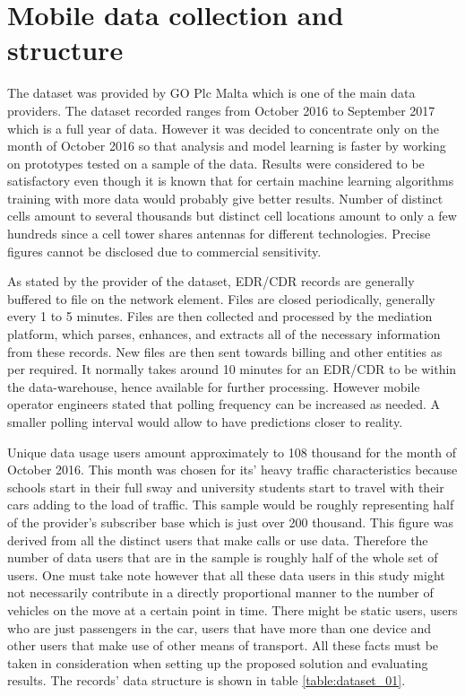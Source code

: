 \documentclass[12pt, a4paper]{report}
\theoremstyle{definition}
\theoremstyle{definition}%
\theoremstyle{definition}%
\theoremstyle{definition}%
\theoremstyle{definition}%
\theoremstyle{definition}%
\begin{document}
\section{Mobile data collection and structure} \label{section:methodology:mobile_data_collection_structure}

The dataset was provided by GO Plc Malta which is one of the main data providers. The dataset recorded ranges from October 2016 to September 2017 which is a full year of data. However it was decided to concentrate only on the month of October 2016 so that analysis and model learning is faster by working on prototypes tested on a sample of the data. Results were considered to be satisfactory even though it is known that for certain machine learning  algorithms training with more data would probably give better results. Number of distinct cells amount to several thousands but distinct cell locations amount to only a few hundreds since a cell tower shares antennas for different technologies. Precise figures cannot be disclosed due to commercial sensitivity.

As stated by the provider of the dataset, EDR/CDR records are generally buffered to file on the network element. Files are closed periodically, generally every 1 to 5 minutes. Files are then collected and processed by the mediation platform, which parses, enhances, and extracts all of the necessary information from these records. New files are then sent towards billing and other entities as per required. It normally takes around 10 minutes for an EDR/CDR to be within the data-warehouse, hence available for further processing. However mobile operator engineers stated that polling frequency can be increased as needed. A smaller polling interval would allow to have predictions closer to reality.

Unique data usage users amount approximately to 108 thousand for the month of October 2016. This month was chosen for its' heavy traffic characteristics because schools start in their full sway and university students start to travel with their cars adding to the load of traffic. This sample would be roughly representing half of the provider's subscriber base which is just over 200 thousand. This figure was derived from all the distinct users that make calls or use data. Therefore the number of data users that are in the sample is roughly half of the whole set of users. One must take note however that all these data users in this study might not necessarily contribute in a directly proportional manner to the number of vehicles on the move at a certain point in time. There might be static users, users who are just passengers in the car, users that have more than one device and other users that make use of other means of transport. All these facts must be taken in consideration when setting up the proposed solution and evaluating results. The records' data structure is shown in table \ref{table:dataset_01}.
\end{document}
